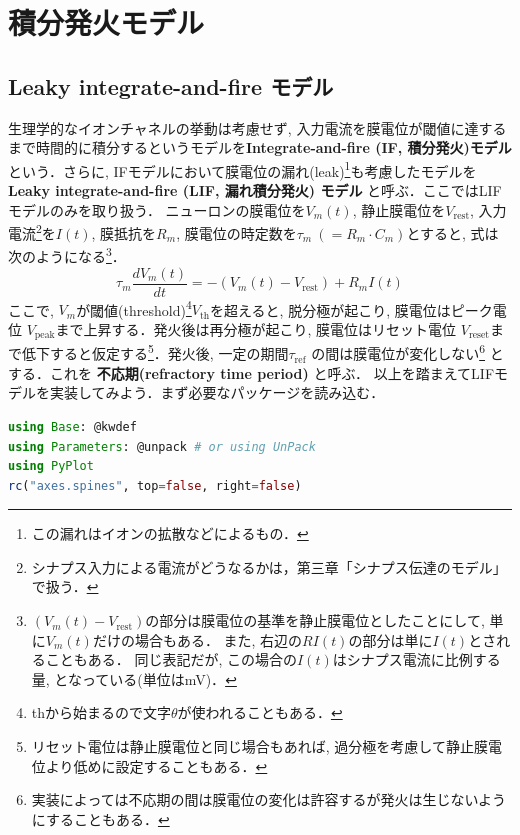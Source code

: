\section{積分発火モデル}
\subsection{Leaky integrate-and-fire モデル}
生理学的なイオンチャネルの挙動は考慮せず, 入力電流を膜電位が閾値に達するまで時間的に積分するというモデルを\textbf{Integrate-and-fire (IF, 積分発火)モデル} という．さらに, IFモデルにおいて膜電位の漏れ(leak)\footnote{この漏れはイオンの拡散などによるもの． }も考慮したモデルを \textbf{Leaky integrate-and-fire (LIF, 漏れ積分発火) モデル} と呼ぶ．ここではLIFモデルのみを取り扱う．
ニューロンの膜電位を$V_m(t)$, 静止膜電位を$V_\text{rest}$, 入力電流\footnote{シナプス入力による電流がどうなるかは，第三章「シナプス伝達のモデル」で扱う．}を$I(t)$, 膜抵抗を$R_m$, 膜電位の時定数を$\tau_m\ (=R_m \cdot C_m)$とすると, 式は次のようになる\footnote{$(V_{m}(t)-V_\text{rest})$の部分は膜電位の基準を静止膜電位としたことにして, 単に$V_m(t)$だけの場合もある． また, 右辺の$RI(t)$の部分は単に$I(t)$とされることもある． 同じ表記だが, この場合の$I(t)$はシナプス電流に比例する量, となっている(単位はmV)． }．
\begin{equation}
\tau_m \frac{dV_{m}(t)}{dt}=-(V_{m}(t)-V_\text{rest})+R_mI(t)
\end{equation}
ここで, $V_m$が閾値(threshold)\footnote{thから始まるので文字$\theta$が使われることもある．}$V_{\text{th}}$を超えると, 脱分極が起こり, 膜電位はピーク電位 $V_{\text{peak}}$まで上昇する．発火後は再分極が起こり, 膜電位はリセット電位 $V_{\text{reset}}$まで低下すると仮定する\footnote{リセット電位は静止膜電位と同じ場合もあれば, 過分極を考慮して静止膜電位より低めに設定することもある．}．発火後, 一定の期間$\tau_{\text{ref}}$ の間は膜電位が変化しない\footnote{実装によっては不応期の間は膜電位の変化は許容するが発火は生じないようにすることもある．} とする．これを \textbf{不応期(refractory time period)} と呼ぶ．
以上を踏まえてLIFモデルを実装してみよう．まず必要なパッケージを読み込む．
\begin{lstlisting}[language=julia]
using Base: @kwdef
using Parameters: @unpack # or using UnPack
using PyPlot
rc("axes.spines", top=false, right=false)
\end{lstlisting}
